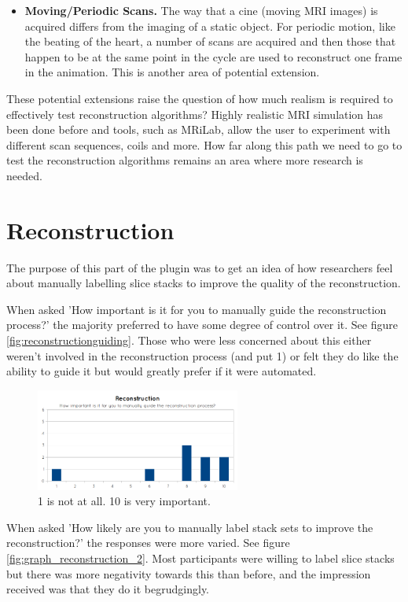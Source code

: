 \begin{itemize}
  \item \textbf{Moving/Periodic Scans.} The way that a cine (moving MRI images) is acquired differs from the imaging of a static object. For periodic motion, like the beating of the heart, a number of scans are acquired and then those that happen to be at the same point in the cycle are used to reconstruct one frame in the animation. This is another area of potential extension.
\end{itemize}

These potential extensions raise the question of how much realism is required to effectively test reconstruction algorithms? Highly realistic MRI simulation has been done before and tools, such as MRiLab\cite{mrilab}, allow the user to experiment with different scan sequences, coils and more. How far along this path we need to go to test the reconstruction algorithms remains an area where more research is needed.

\newpage
\section{Reconstruction}
The purpose of this part of the plugin was to get an idea of how researchers feel about manually labelling slice stacks to improve the quality of the reconstruction. 

When asked 'How important is it for you to manually guide the reconstruction process?' the majority preferred to have some degree of control over it. See figure \ref{fig:reconstructionguiding}. Those who were less concerned about this either weren't involved in the reconstruction process (and put 1) or felt they do like the ability to guide it but would greatly prefer if it were automated.

\begin{figure}[h]
    \centering
  \includegraphics[width=0.6\textwidth]{images/evaluation/graph_reconstruction_1.png}
    \caption{1 is not at all. 10 is very important.}\label{fig:graph_reconstruction_1}
\end{figure}

When asked 'How likely are you to manually label stack sets to improve the reconstruction?' the responses were more varied. See figure \ref{fig:graph_reconstruction_2}. Most participants were willing to label slice stacks but there was more negativity towards this than before, and the impression received was that they do it begrudgingly.

